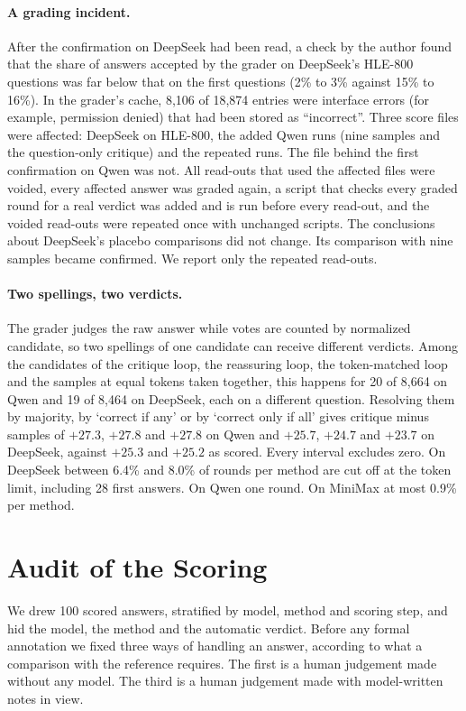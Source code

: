 \documentclass[11pt]{article}
\newcommand{\ds}{DeepSeek}
\newcommand{\qw}{Qwen}
\newcommand{\mm}{MiniMax}
\begin{document}
\paragraph{A grading incident.}
After the confirmation on \ds{} had been read, a check by the author found that the share of answers accepted by the grader on \ds's HLE-800 questions was far below that on the first questions (2\% to 3\% against 15\% to 16\%). In the grader's cache, 8{,}106 of 18{,}874 entries were interface errors (for example, permission denied) that had been stored as ``incorrect''. Three score files were affected: \ds{} on HLE-800, the added \qw{} runs (nine samples and the question-only critique) and the repeated runs. The file behind the first confirmation on \qw{} was not. All read-outs that used the affected files were voided, every affected answer was graded again, a script that checks every graded round for a real verdict was added and is run before every read-out, and the voided read-outs were repeated once with unchanged scripts. The conclusions about \ds's placebo comparisons did not change. Its comparison with nine samples became confirmed. We report only the repeated read-outs.

\paragraph{Two spellings, two verdicts.}
The grader judges the raw answer while votes are counted by normalized candidate, so two spellings of one candidate can receive different verdicts. Among the candidates of the critique loop, the reassuring loop, the token-matched loop and the samples at equal tokens taken together, this happens for 20 of 8{,}664 on \qw{} and 19 of 8{,}464 on \ds, each on a different question. Resolving them by majority, by `correct if any' or by `correct only if all' gives critique minus samples of $+27.3$, $+27.8$ and $+27.8$ on \qw{} and $+25.7$, $+24.7$ and $+23.7$ on \ds, against $+25.3$ and $+25.2$ as scored. Every interval excludes zero.
On \ds{} between 6.4\% and 8.0\% of rounds per method are cut off at the token limit, including 28 first answers. On \qw{} one round. On \mm{} at most 0.9\% per method.

\section{Audit of the Scoring}
\label{app:audit}

We drew 100 scored answers, stratified by model, method and scoring step, and hid the model, the method and the automatic verdict.
Before any formal annotation we fixed three ways of handling an answer, according to what a comparison with the reference requires.
The first is a human judgement made without any model. The third is a human judgement made with model-written notes in view.
\end{document}

